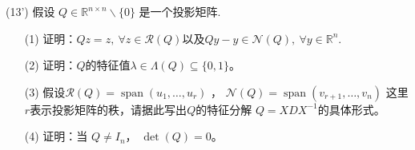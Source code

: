\documentclass[12pt,a4paper,openany,twoside]{ctexbook}
\begin{document}
\begin{exercise}(13')
	假设 $Q \in \mathbb{R}^{n \times n} \backslash\{0\}$ 是一个投影矩阵.\\
	\begin{itemize}
		\item [(1)] 证明：$Q z=z, \ \forall z \in \mathcal{R}(Q)$以及$Q y-y \in \mathcal{N}(Q), \ \forall y \in \mathbb{R}^n$.
		\item [(2)] 证明：$Q$的特征值$\lambda \in \Lambda(Q) \subseteq\{0,1\}$。
		\item [(3)]  假设$\mathcal{R}(Q)=\operatorname{span}\left(u_1, \ldots, u_r\right)$ ， $\mathcal{N}(Q)=\operatorname{span}\left(v_{r+1}, \ldots, v_n\right)$ 这里$r$表示投影矩阵的秩，请据此写出$Q$的特征分解 $Q=X D X^{-1}$的具体形式。
		\item [(4)] 证明：当 $Q \neq I_n$， $\operatorname{det}(Q)=0$。
	\end{itemize}
	
\end{exercise}
%
%
%
%	
\end{document}
